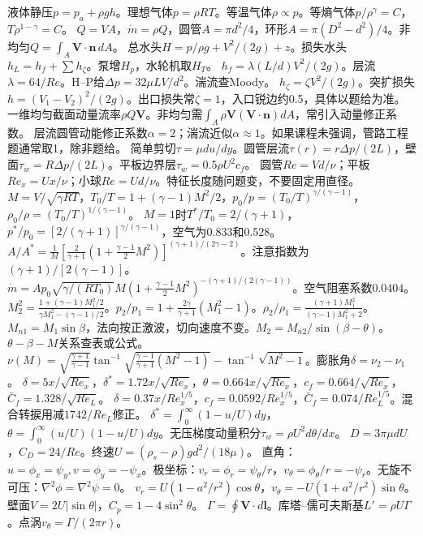 液体静压$p=p_a+\rho gh$。理想气体$p=\rho RT$。等温气体$\rho\propto p$。等熵气体$p/\rho^\gamma=C$，$T\rho^{1-\gamma}=C$。
$Q=VA$，$\dot m=\rho Q$，圆管$A=\pi d^2/4$，环形$A=\pi(D^2-d^2)/4$。非均匀$Q=\int_A\bm V\cdot\bm n\,dA$。
总水头$H=p/\rho g+V^2/(2g)+z$。损失水头$h_L=h_f+\sum h_\zeta$。泵增$H_p$，水轮机取$H_T$。
$h_f=\lambda(L/d)V^2/(2g)$。层流$\lambda=64/Re$。H--P给$\Delta p=32\mu LV/d^2$。湍流查Moody。
$h_\zeta=\zeta V^2/(2g)$。突扩损失$h=(V_1-V_2)^2/(2g)$。出口损失常$\zeta=1$，入口锐边约0.5，具体以题给为准。
一维均匀截面动量流率$\rho Q\bm V$。非均匀需$\int_A\rho\bm V(\bm V\cdot\bm n)dA$，常引入动量修正系数。
层流圆管动能修正系数$\alpha=2$；湍流近似$\alpha\approx1$。如果课程未强调，管路工程题通常取1，除非题给。
简单剪切$\tau=\mu du/dy$。圆管层流$\tau(r)=r\Delta p/(2L)$，壁面$\tau_w=R\Delta p/(2L)$。平板边界层$\tau_w=0.5\rho U^2 c_f$。
圆管$Re=Vd/\nu$；平板$Re_x=Ux/\nu$；小球$Re=Ud/\nu$。特征长度随问题变，不要固定用直径。
$M=V/\sqrt{\gamma RT}$，$T_0/T=1+(\gamma-1)M^2/2$，$p_0/p=(T_0/T)^{\gamma/(\gamma-1)}$，$\rho_0/\rho=(T_0/T)^{1/(\gamma-1)}$。
$M=1$时$T^*/T_0=2/(\gamma+1)$，$p^*/p_0=[2/(\gamma+1)]^{\gamma/(\gamma-1)}$，空气为0.833和0.528。
$A/A^*=\frac1M[\frac{2}{\gamma+1}(1+\frac{\gamma-1}{2}M^2)]^{(\gamma+1)/(2\gamma-2)}$。注意指数为$(\gamma+1)/[2(\gamma-1)]$。
$\dot m=A p_0\sqrt{\gamma/(RT_0)}M(1+\frac{\gamma-1}{2}M^2)^{-(\gamma+1)/(2(\gamma-1))}$。空气阻塞系数$0.0404$。
$M_2^2=\frac{1+(\gamma-1)M_1^2/2}{\gamma M_1^2-(\gamma-1)/2}$。$p_2/p_1=1+\frac{2\gamma}{\gamma+1}(M_1^2-1)$。$\rho_2/\rho_1=\frac{(\gamma+1)M_1^2}{(\gamma-1)M_1^2+2}$。
$M_{n1}=M_1\sin\beta$，法向按正激波，切向速度不变。$M_2=M_{n2}/\sin(\beta-\theta)$。$\theta-\beta-M$关系查表或公式。
$\nu(M)=\sqrt{\frac{\gamma+1}{\gamma-1}}\tan^{-1}\sqrt{\frac{\gamma-1}{\gamma+1}(M^2-1)}-\tan^{-1}\sqrt{M^2-1}$。膨胀角$\delta=\nu_2-\nu_1$。
$\delta=5x/\sqrt{Re_x}$，$\delta^*=1.72x/\sqrt{Re_x}$，$\theta=0.664x/\sqrt{Re_x}$，$c_f=0.664/\sqrt{Re_x}$，$\bar C_f=1.328/\sqrt{Re_L}$。
$\delta=0.37x/Re_x^{1/5}$，$c_f=0.0592/Re_x^{1/5}$，$\bar C_f=0.074/Re_L^{1/5}$。混合转捩用减$1742/Re_L$修正。
$\delta^*=\int_0^\infty(1-u/U)dy$，$\theta=\int_0^\infty(u/U)(1-u/U)dy$。无压梯度动量积分$\tau_w=\rho U^2d\theta/dx$。
$D=3\pi\mu dU$，$C_D=24/Re$。终速$U=(\rho_s-\rho)gd^2/(18\mu)$。
直角：$u=\phi_x=\psi_y,v=\phi_y=-\psi_x$。极坐标：$v_r=\phi_r=\psi_\theta/r$，$v_\theta=\phi_\theta/r=-\psi_r$。无旋不可压：$\nabla^2\phi=\nabla^2\psi=0$。
$v_r=U(1-a^2/r^2)\cos\theta$，$v_\theta=-U(1+a^2/r^2)\sin\theta$。壁面$V=2U|\sin\theta|$，$C_p=1-4\sin^2\theta$。
$\Gamma=\oint\bm V\cdot d\bm l$。库塔--儒可夫斯基$L'=\rho U\Gamma$。点涡$v_\theta=\Gamma/(2\pi r)$。

